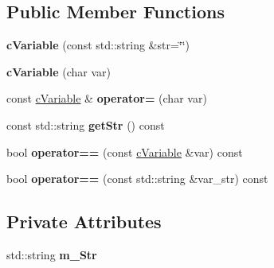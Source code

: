 \subsection*{Public Member Functions}
\begin{DoxyCompactItemize}
\item 
\hypertarget{classcVariable_a683453f7a1fc448a00bddaad2f2a2f2d}{{\bfseries c\-Variable} (const std\-::string \&str=\char`\"{}\char`\"{})}\label{classcVariable_a683453f7a1fc448a00bddaad2f2a2f2d}

\item 
\hypertarget{classcVariable_a5fd9158aee931864bda99d6ed79b8229}{{\bfseries c\-Variable} (char var)}\label{classcVariable_a5fd9158aee931864bda99d6ed79b8229}

\item 
\hypertarget{classcVariable_a646d3651cbb67ce833998ad6840d83e8}{const \hyperlink{classcVariable}{c\-Variable} \& {\bfseries operator=} (char var)}\label{classcVariable_a646d3651cbb67ce833998ad6840d83e8}

\item 
\hypertarget{classcVariable_ae3f7fff180632a744d54391d69df061b}{const std\-::string {\bfseries get\-Str} () const }\label{classcVariable_ae3f7fff180632a744d54391d69df061b}

\item 
\hypertarget{classcVariable_a3c6374e812fbb95f9acb4983666f36ba}{bool {\bfseries operator==} (const \hyperlink{classcVariable}{c\-Variable} \&var) const }\label{classcVariable_a3c6374e812fbb95f9acb4983666f36ba}

\item 
\hypertarget{classcVariable_ac732da50dd8fe2f0a4ab000c6b556143}{bool {\bfseries operator==} (const std\-::string \&var\-\_\-str) const }\label{classcVariable_ac732da50dd8fe2f0a4ab000c6b556143}

\end{DoxyCompactItemize}
\subsection*{Private Attributes}
\begin{DoxyCompactItemize}
\item 
\hypertarget{classcVariable_a21ed6c7259f7e8dbe4be083ff851bad5}{std\-::string {\bfseries m\-\_\-\-Str}}\label{classcVariable_a21ed6c7259f7e8dbe4be083ff851bad5}

\end{DoxyCompactItemize}
